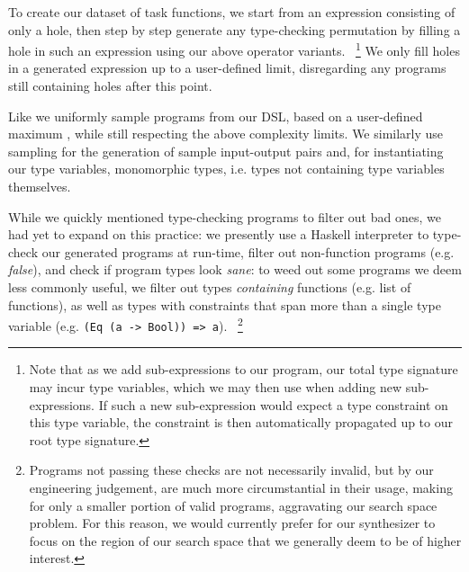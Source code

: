 \documentclass{article}
\begin{document}

To create our dataset of task functions,
we start from an expression consisting of only a hole,
then step by step generate any type-checking permutation
by filling a hole in such an expression using our above operator variants.%
~\footnote{
    Note that as we add sub-expressions to our program,
    our total type signature may incur type variables,
    which we may then use when adding new sub-expressions.
    If such a new sub-expression would expect a type constraint on this type variable,
    the constraint is then automatically propagated up to our root type signature.
}
We only fill holes in a generated expression up to a 
user-defined limit,
disregarding any programs still containing holes after this point.

Like \citet{nsps} we uniformly sample programs from our DSL,
based on a 
user-defined maximum%
,
while still respecting the above complexity limits.
We similarly use sampling for the generation of sample input-output pairs and,
for instantiating our type variables, monomorphic types,
i.e. types not containing type variables themselves.

While we quickly mentioned type-checking programs to filter out bad ones,
we had yet to expand on this practice:
we presently use a Haskell interpreter to type-check our generated programs at run-time,
filter out non-function programs (e.g. \emph{false}),
and check if program types look \emph{sane}:
to weed out some programs we deem less commonly useful,
we filter out types \emph{containing} functions (e.g. list of functions),
as well as types with constraints that span more than a single type variable (e.g. \verb|(Eq (a -> Bool)) => a|).%
~\footnote{
    Programs not passing these checks are not necessarily invalid,
    but by our engineering judgement,
    are much more circumstantial in their usage,
    making for only a smaller portion of valid programs,
    aggravating our search space problem.
    For this reason, we would currently prefer for our synthesizer to focus on
    the region of our search space that we generally deem to be of higher interest.
}
\end{document}
